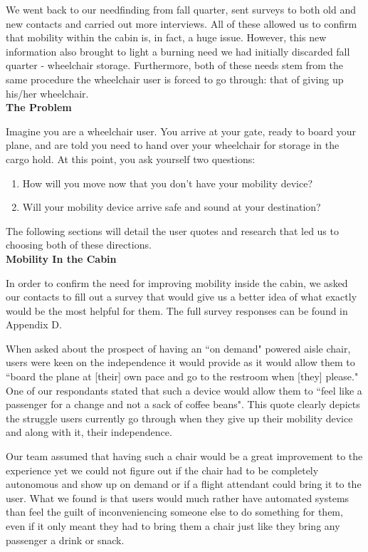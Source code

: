 We went back to our needfinding from fall quarter, sent surveys to both old and new contacts and carried out more interviews. All of these allowed us to confirm that mobility within the cabin is, in fact, a huge issue. However, this new information also brought to light a burning need we had initially discarded fall quarter - wheelchair storage. Furthermore, both of these needs stem from the same procedure the wheelchair user is forced to go through: that of giving up his/her wheelchair. \\

\textbf{The Problem}

Imagine you are a wheelchair user. You arrive at your gate, ready to board your plane, and are told you need to hand over your wheelchair for storage in the cargo hold. At this point, you ask yourself two questions: 
\begin{enumerate}
	\item How will you move now that you don't have your mobility device? 
	\item Will your mobility device arrive safe and sound at your destination?
\end{enumerate}
The following sections will detail the user quotes and research that led us to choosing both of these directions.  
\\

\textbf{Mobility In the Cabin}

In order to confirm the need for improving mobility inside the cabin, we asked our contacts to fill out a survey that would give us a better idea of what exactly would be the most helpful for them. The full survey responses can be found in Appendix D.
 
When asked about the prospect of having an ``on demand"  powered aisle chair, users were keen on the independence it would provide as it would allow them to ``board the plane at [their] own pace and go to the restroom when [they] please." One of our respondants stated that such a device would allow them to ``feel like a passenger for a change and not a sack of coffee beans". This quote clearly depicts the struggle users currently go through when they give up their mobility device and along with it, their independence.

Our team assumed that having such a chair would be a great improvement to the experience yet we could not figure out if the chair had to be completely autonomous and show up on demand or if a flight attendant could bring it to the user. What we found is that users would much rather have automated systems than feel the guilt of inconveniencing someone else to do something for them, even if it only meant they had to bring them a chair just like they bring any passenger a drink or snack. 


